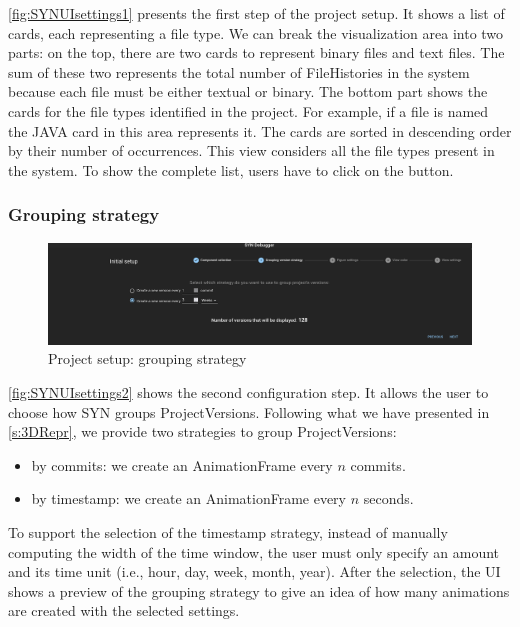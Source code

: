 \autoref{fig:SYNUIsettings1} presents the first step of the project setup. It shows a list of cards, each representing a file type. 
We can break the visualization area into two parts: on the top, there are two cards to represent binary files and text files. 
The sum of these two represents the total number of FileHistories in the system because each file must be either textual or binary. 
The bottom part shows the cards for the file types identified in the project. For example, if a file is named  the JAVA card in this area represents it. 
The cards are sorted in descending order by their number of occurrences. This view considers all the file types present in the system. To show the complete list, users have to click on the  button.

\subsubsection*{Grouping strategy}

\begin{figure} [h]
    \center
    \includegraphics[width=\textwidth]{SYNUI-settings2.png}
    \caption{Project setup: grouping strategy}
    \label{fig:SYNUIsettings2}
\end{figure}

\autoref{fig:SYNUIsettings2} shows the second configuration step. It allows the user to choose how SYN groups ProjectVersions. 
Following what we have presented in \autoref{s:3DRepr}, we provide two strategies to group ProjectVersions:
\begin{itemize}
    \item by commits: we create an AnimationFrame every $n$ commits. 
    \item by timestamp: we create an AnimationFrame every $n$ seconds. 
\end{itemize}

To support the selection of the timestamp strategy, instead of manually computing the width of the time window, the user must only specify an amount and its time unit (i.e., hour, day, week, month, year). After the selection, the UI shows a preview of the grouping strategy to give an idea of how many animations are created with the selected settings. 

